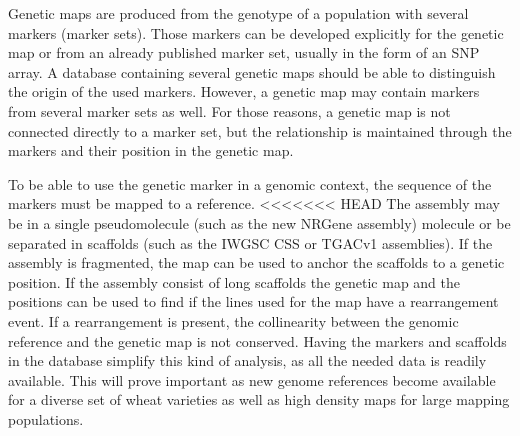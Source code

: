 Genetic maps are produced from the genotype of a population with several markers (marker sets). 
Those markers can be developed explicitly for the genetic map or from an already published marker set, usually in the form of an SNP array. 
A database containing several genetic maps should be able to distinguish the origin of the used markers.
However, a genetic map may contain markers from several marker sets as well.
For those reasons, a genetic map is not connected directly to a marker set, but the relationship is maintained through the markers and their position in the genetic map.

To be able to use the genetic marker in a genomic context, the sequence of the markers must be mapped to a reference. 
<<<<<<< HEAD
The assembly may be in a single pseudomolecule (such as the new NRGene assembly) molecule or be separated in scaffolds (such as the IWGSC CSS or TGACv1 assemblies). 
If the assembly is fragmented, the  map can be used to anchor the scaffolds to a genetic position. 
If the assembly consist of long scaffolds the genetic map and the positions can be used to find if the lines used for the map have a rearrangement event. 
If a rearrangement is present, the collinearity between the genomic reference and the genetic map is not conserved. 
Having the markers and scaffolds in the database simplify this kind of analysis, as all the needed data is readily available. 
This will prove important as new genome references become available for a diverse set of wheat varieties as well as high density maps for large mapping populations. 

